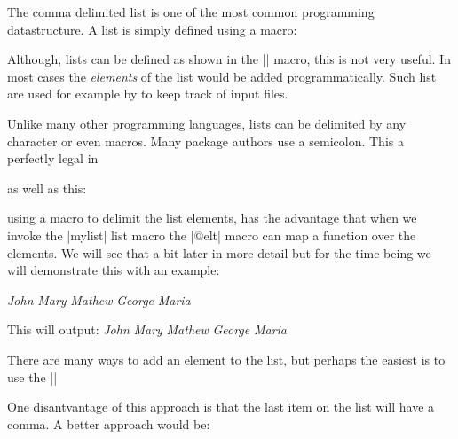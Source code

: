 The comma delimited list is one of the most common programming datastructure. A list is simply defined using a macro:

\begin{teXXX}
\def\mylist{John,Mary,Mathew,George,Maria}
\end{teXXX}

Although, lists can be defined as shown in the |\mylist| macro, this is not very useful. In most cases the \textit{elements} of the list would be added programmatically. Such list are used for example by \latex to keep track of input files.

Unlike many other programming languages, lists can be delimited by any character or even macros. Many package authors use a semicolon. This a perfectly legal in \tex
\begin{teXXX}
\end{teXXX}
as well as this:

\begin{teXXX}
\end{teXXX}

using a macro to delimit the list elements, has the advantage that when we invoke the |mylist| list macro the |@elt| macro can map a function over the elements. We will see that a bit later in more detail but for the time being we will demonstrate this with an example:
\begin{teX}
\def\mylist{\@elt John,\@elt Mary,\@elt Mathew, \@elt George, \@elt Maria,}
\def\@elt#1,{\textit{#1} }
\mylist
\end{teX}
This will output:
{
\makeatletter
\def\mylist{\@elt John,\@elt Mary,\@elt Mathew, \@elt George, \@elt Maria,}
\def\@elt#1,{\textit{#1} }
\mylist}
\makeatother


There are many ways to add an element to the list, but perhaps the easiest is to use the \latex |\g@addto@macro|

\begin{teXXX}
\mylist
\end{teXXX}

One disantvantage of this approach is that the last item on the list will have a comma. A better approach would be:
%
%
%

